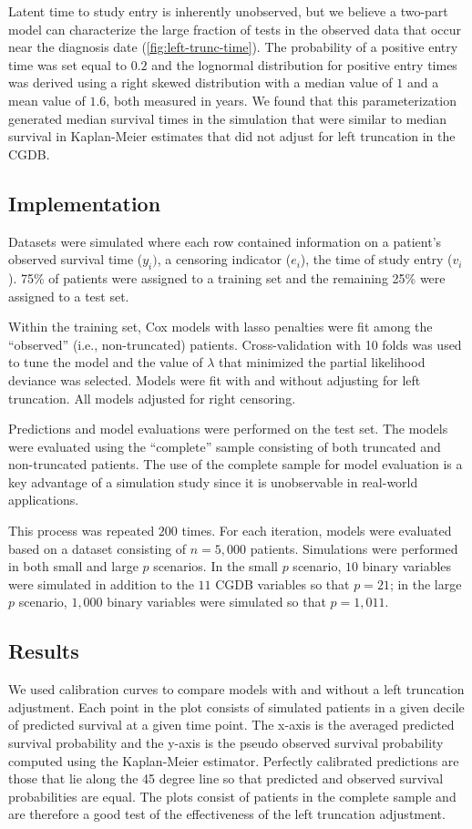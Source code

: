\documentclass[11pt,final,fleqn]{article}\usepackage[]{graphicx}\usepackage[]{color}
\theoremstyle{plain}
\begin{document}
Latent time to study entry is inherently unobserved, but we believe a two-part model can characterize the large fraction of tests in the observed data that occur near the diagnosis date  (\autoref{fig:left-trunc-time}). The probability of a positive entry time was set equal to $0.2$ and the lognormal distribution for positive entry times was derived using a right skewed distribution with a median value of $1$ and a mean value of $1.6$, both measured in years.  We found that this parameterization generated median survival times in the simulation that were similar to median survival in Kaplan-Meier estimates that did not adjust for left truncation in the CGDB.

\subsection{Implementation}
Datasets were simulated where each row contained information on a patient's observed survival time ($y_i)$, a censoring indicator ($e_i$), the time of study entry ($v_i$). 75\%  of patients were assigned to a training set and the remaining 25\% were assigned to a test set. 

Within the training set, Cox models with lasso penalties were fit among the ``observed'' (i.e., non-truncated) patients. Cross-validation with 10 folds was used to tune the  model and the value of $\lambda$ that minimized the partial likelihood deviance was selected. Models were fit with and without adjusting for left truncation. All models adjusted for right censoring.

Predictions and model evaluations were performed on the test set. The models were evaluated using the ``complete'' sample consisting of both truncated and non-truncated patients. The use of the complete sample for model evaluation is a key advantage of a simulation study since it is unobservable in real-world applications.

This process was repeated $200$ times. For each iteration, models were evaluated based on a dataset consisting of $n=5,000$ patients. Simulations were performed in both small and large $p$ scenarios. In the small $p$ scenario, $10$ binary variables were simulated in addition to the $11$ CGDB variables so that $p=21$; in the large $p$ scenario, $1,000$ binary variables were simulated so that $p=1,011$.

\subsection{Results}
We used calibration curves \cite{harrell2015regression} to compare models with and without a left truncation adjustment. Each point in the plot consists of simulated patients in a given decile of predicted survival at a given time point. The x-axis is the averaged predicted survival probability and the y-axis is the pseudo observed survival probability computed using the Kaplan-Meier estimator. Perfectly calibrated predictions are those that lie along the 45 degree line so that predicted and observed survival probabilities are equal. The plots consist of patients in the complete sample and are therefore a good test of the effectiveness of the left truncation adjustment.
\end{document}
